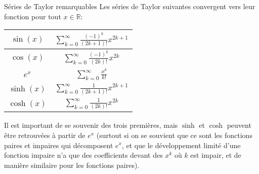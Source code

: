 \documentclass[a4paper]{article}
\begin{document}
\begin{parag}{Séries de Taylor remarquables}
    Les séries de Taylor suivantes convergent vers leur fonction pour tout $x \in \mathbb{R}$:
    \begin{center}
    \begin{tabular}{|c|c|}
        \hline
        $\displaystyle \sin\left(x\right)$ & $\displaystyle \sum_{k=0}^{\infty} \frac{\left(-1\right)^k}{\left(2k + 1\right)!} x^{2k + 1}$  \\
        \hline
        $\displaystyle \cos\left(x\right)$ & $\displaystyle \sum_{k=0}^{\infty} \frac{\left(-1\right)^k}{\left(2k\right)!} x^{2k}$  \\
        \hline
        $\displaystyle e^x$ & $\displaystyle \sum_{k=0}^{\infty} \frac{x^k}{k!}$ \\
        \hhline{|=|=|}
        $\displaystyle \sinh\left(x\right)$ & $\displaystyle \sum_{k=0}^{\infty} \frac{1}{\left(2k + 1\right)!} x^{2k + 1}$  \\
        \hline
        $\displaystyle \cosh\left(x\right)$ & $\displaystyle \sum_{k=0}^{\infty} \frac{1}{\left(2k\right)!} x^{2k}$ \\
        \hline
    \end{tabular}
    \end{center}

    Il est important de se souvenir des trois premières, mais $\sinh$ et $\cosh$ peuvent être retrouvées à partir de $e^x$ (surtout si on se souvient que ce sont les fonctions paires et impaires qui décomposent $e^x$, et que le développement limité d'une fonction impaire n'a que des coefficients devant des $x^k$ où $k$ est impair, et de manière similaire pour les fonctions paires).
\end{parag}
\end{document}
